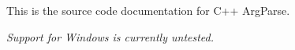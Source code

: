 This is the source code documentation for C++ Arg\+Parse.

{\itshape Support for Windows is currently untested.} 